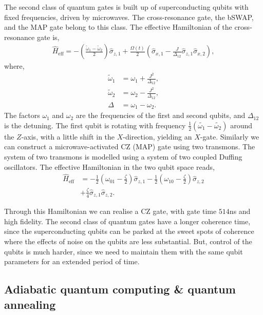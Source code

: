 The second class of quantum gates is built up of superconducting qubits with fixed frequencies, driven by microwaves. The cross-resonance gate, the bSWAP, and the MAP gate belong to this class. The effective Hamiltonian of the cross-resonance gate is,
\begin{align}
\hat{H}_\mathrm{eff} = - \left( \frac{\tilde{\omega}_{1} - \tilde{\omega}_2}{2} \right) \hat\sigma_{z,1} + \frac{\Omega(t)}{2} \left(\hat\sigma_{x,1} - \frac{J}{\Delta_{12}} \hat\sigma_{z,1} \hat\sigma_{x,2} \right),
\end{align}
where,
\begin{align}
	\tilde{\omega}_{1} &= \omega_{1} + \frac{J^{2}}{\Delta_{12}}, \nonumber\\
		\tilde{\omega}_{2} &= \omega_{2} - \frac{J^{2}}{\Delta_{12}}, \nonumber\\
\Delta &= \omega_{1} -\omega_{2}.		
\end{align}
The factors $\omega_{1}$ and $\omega_{2}$ are the frequencies of the first and second qubits, and $\Delta_{12}$ is the detuning. The first qubit is rotating with frequency $\frac{1}{2}(\tilde{\omega_{1}} - \tilde{\omega_{2}})$ around the $Z$-axis, with a little shift in the $X$-direction, yielding an $X$-gate. Similarly we can construct a microwave-activated CZ (MAP) gate using two transmons. The system of two transmons is modelled using a system of two coupled Duffing oscillators. The effective Hamiltonian in the two qubit space reads,
\begin{align}
\hat{H}_\mathrm{eff} &= - \frac{1}{2} \left( \omega_{01} - \frac{\zeta}{2} \right) \hat\sigma_{z,1} - \frac{1}{2} \left( \omega_{10} - \frac{\zeta}{2} \right) \hat\sigma_{z,2} \nonumber\\
&+ \frac{\zeta}{4} \hat\sigma_{z,1} \hat\sigma_{z,2}. 
\end{align}

Through this Hamiltonian we can realise a CZ gate, with gate time $514$ns and high fidelity. The second class of quantum gates have a longer coherence time, since the superconducting qubits can be parked at the sweet spots of coherence where the effects of noise on the qubits are less substantial. But, control of the qubits is much harder, since we need to maintain them with the same qubit parameters for an extended period of time.

%
%

\subsection{Adiabatic quantum computing \& quantum annealing}

